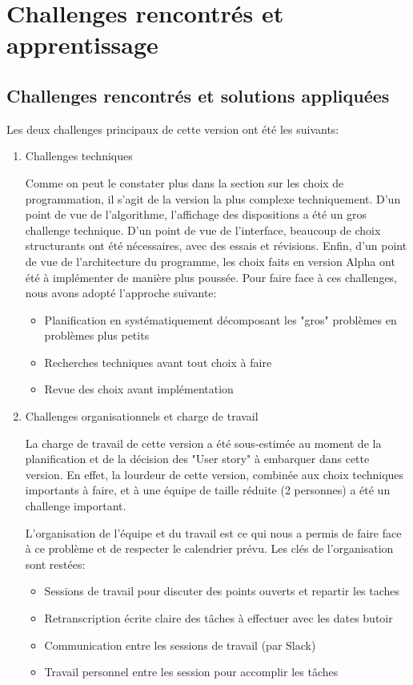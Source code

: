 \section{Challenges rencontrés et apprentissage}

\subsection{Challenges rencontrés et solutions appliquées}

Les deux challenges principaux de cette version ont été les suivants:
\begin{enumerate}
    \item Challenges techniques

          Comme on peut le constater plus dans la section sur les choix de programmation, il s’agit de la version la plus complexe techniquement.
          D’un point de vue de l’algorithme, l’affichage des dispositions a été un gros challenge technique.
          D’un point de vue de l’interface, beaucoup de choix structurants ont été nécessaires, avec des essais et révisions.
          Enfin, d’un point de vue de l’architecture du programme, les choix faits en version Alpha ont été à implémenter de manière plus poussée.
          Pour faire face à ces challenges, nous avons adopté l’approche suivante:
          \begin{itemize}
              \item Planification en systématiquement décomposant les "gros" problèmes en problèmes plus petits
              \item Recherches techniques avant tout choix à faire
              \item Revue des choix avant implémentation
          \end{itemize}
    \item Challenges organisationnels et charge de travail

          La charge de travail de cette version a été sous-estimée au moment de la planification et de la décision des "User story" à embarquer
          dans cette version. En effet, la lourdeur de cette version, combinée aux choix techniques importants à faire, et à une équipe
          de taille réduite (2 personnes) a été un challenge important.

          L’organisation de l'équipe et du travail est ce qui nous a permis de faire face à ce problème et de respecter le calendrier prévu.
          Les clés de l’organisation sont restées:
          \begin{itemize}
              \item Sessions de travail pour discuter des points ouverts et repartir les taches
              \item Retranscription écrite claire des tâches à effectuer avec les dates butoir
              \item Communication entre les sessions de travail (par Slack)
              \item Travail personnel entre les session pour accomplir les tâches
          \end{itemize}

\end{enumerate}


